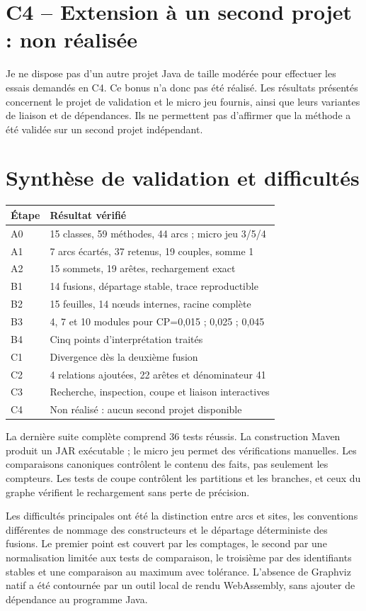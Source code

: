 \documentclass[11pt,a4paper]{article}
\begin{document}
\section{C4 -- Extension à un second projet : non réalisée}
Je ne dispose pas d'un autre projet Java de taille modérée pour effectuer
les essais demandés en C4. Ce bonus n'a donc pas été réalisé. Les résultats
présentés concernent le projet de validation et le micro jeu fournis, ainsi
que leurs variantes de liaison et de dépendances. Ils ne permettent pas
d'affirmer que la méthode a été validée sur un second projet indépendant.

\section{Synthèse de validation et difficultés}
\begin{center}
\begin{tabular}{ll}
Étape & Résultat vérifié \\
\hline
A0 & 15 classes, 59 méthodes, 44 arcs ; micro jeu 3/5/4 \\
A1 & 7 arcs écartés, 37 retenus, 19 couples, somme 1 \\
A2 & 15 sommets, 19 arêtes, rechargement exact \\
B1 & 14 fusions, départage stable, trace reproductible \\
B2 & 15 feuilles, 14 nœuds internes, racine complète \\
B3 & 4, 7 et 10 modules pour CP=0,015 ; 0,025 ; 0,045 \\
B4 & Cinq points d'interprétation traités \\
C1 & Divergence dès la deuxième fusion \\
C2 & 4 relations ajoutées, 22 arêtes et dénominateur 41 \\
C3 & Recherche, inspection, coupe et liaison interactives \\
C4 & Non réalisé : aucun second projet disponible
\end{tabular}
\end{center}
La dernière suite complète comprend 36 tests réussis. La construction Maven
produit un JAR exécutable ; le micro jeu permet des vérifications manuelles.
Les comparaisons canoniques contrôlent le contenu des faits, pas seulement
les compteurs. Les tests de coupe contrôlent les partitions et les branches,
et ceux du graphe vérifient le rechargement sans perte de précision.

Les difficultés principales ont été la distinction entre arcs et sites,
les conventions différentes de nommage des constructeurs et le départage
déterministe des fusions. Le premier point est couvert par les comptages,
le second par une normalisation limitée aux tests de comparaison, le troisième
par des identifiants stables et une comparaison au maximum avec tolérance.
L'absence de Graphviz natif a été contournée par un outil local de rendu
WebAssembly, sans ajouter de dépendance au programme Java.
\end{document}
